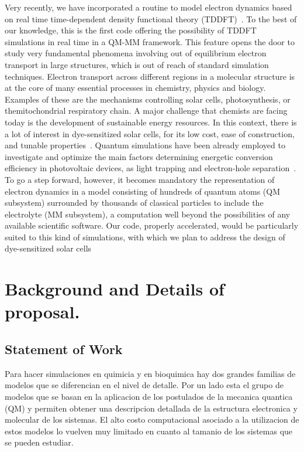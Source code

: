 \documentclass[a4paper,10pt]{article}
\begin{document}
Very recently, we have incorporated a routine to model electron dynamics based on real time time-dependent density functional theory (TDDFT)~\cite{Morzan2014}.
To the best of our knowledge, this is the first code offering the possibility of TDDFT simulations in real time in a QM-MM framework.
This feature opens the door to study very fundamental phenomena involving out of equilibrium electron transport in large structures, which is out of reach of
standard simulation techniques.
Electron transport across different regions in a molecular structure is at the core of many essential processes in chemistry, physics and biology.
Examples of these are the mechanisms controlling solar cells, photosynthesis, or themitochondrial respiratory chain.
A major challenge that chemists are facing today is the development of sustainable energy resources.
In this context, there is a lot of interest in dye-sensitized solar cells, for its low cost, ease of construction, and tunable properties~\cite{Hardin2012,Mathew2014}.
Quantum simulations have been already employed to investigate and optimize the main factors determining energetic conversion efficiency in photovoltaic devices, as light trapping and electron-hole separation~\cite{Mathew2014,Bruggemann2006}.
To go a step forward, however, it becomes mandatory the representation of electron dynamics in a model consisting of hundreds of quantum atoms (QM subsystem) surrounded by thousands of
classical particles to include the electrolyte (MM subsystem), a computation well beyond the possibilities of any available scientific software.
Our code, properly accelerated, would be particularly suited to this kind of simulations, with which we plan to address the design of dye-sensitized solar cells

\newpage

\section{Background and Details of proposal.}

\subsection{Statement of Work}

Para hacer simulaciones en quimicia y en bioquimica hay dos grandes familias de modelos que se diferencian en el nivel de detalle.
Por un lado esta el grupo de modelos que se basan en la aplicacion de los postulados de la mecanica quantica (QM) y permiten obtener una descripcion detallada de la estructura electronica y molecular de los sistemas.
El alto costo computacional asociado a la utilizacion de estos modelos lo vuelven muy limitado en cuanto al tamanio de los sistemas  que se pueden estudiar.
\end{document}
